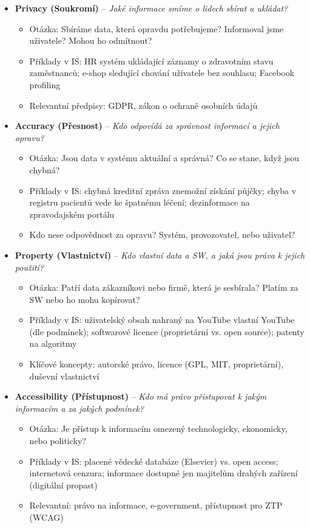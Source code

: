 \begin{itemize}
  \item \textbf{Privacy (Soukromí)} -- \textit{Jaké informace smíme o lidech sbírat a ukládat?}
    \begin{itemize}
      \item Otázka: Sbíráme data, která opravdu potřebujeme? Informoval jsme uživatele? Mohou ho odmítnout?
      \item Příklady v IS: HR systém ukládající záznamy o zdravotním stavu zaměstnanců;
        e-shop sledující chování uživatele bez souhlasu; Facebook profiling
      \item Relevantní předpisy: GDPR, zákon o ochraně osobních údajů
    \end{itemize}
  \item \textbf{Accuracy (Přesnost)} -- \textit{Kdo odpovídá za správnost informací a jejich opravu?}
    \begin{itemize}
      \item Otázka: Jsou data v systému aktuální a správná? Co se stane, když jsou chybná?
      \item Příklady v IS: chybná kreditní zpráva znemožní získání půjčky; chyba v registru pacientů
        vede ke špatnému léčení; dezinformace na zpravodajském portálu
      \item Kdo nese odpovědnost za opravu? Systém, provozovatel, nebo uživatel?
    \end{itemize}
  \item \textbf{Property (Vlastnictví)} -- \textit{Kdo vlastní data a SW, a jaká jsou práva k jejich použití?}
    \begin{itemize}
      \item Otázka: Patří data zákazníkovi nebo firmě, která je sesbírala? Platím za SW nebo ho mohu kopírovat?
      \item Příklady v IS: uživatelský obsah nahraný na YouTube vlastní YouTube (dle podmínek);
        softwarové licence (proprietární vs. open source); patenty na algoritmy
      \item Klíčové koncepty: autorské právo, licence (GPL, MIT, proprietární), duševní vlastnictví
    \end{itemize}
  \item \textbf{Accessibility (Přístupnost)} -- \textit{Kdo má právo přistupovat k jakým informacím a za jakých podmínek?}
    \begin{itemize}
      \item Otázka: Je přístup k informacím omezený technologicky, ekonomicky, nebo politicky?
      \item Příklady v IS: placené vědecké databáze (Elsevier) vs. open access;
        internetová cenzura; informace dostupné jen majitelům drahých zařízení (digitální propast)
      \item Relevantní: právo na informace, e-government, přístupnost pro ZTP (WCAG)
    \end{itemize}
\end{itemize}

